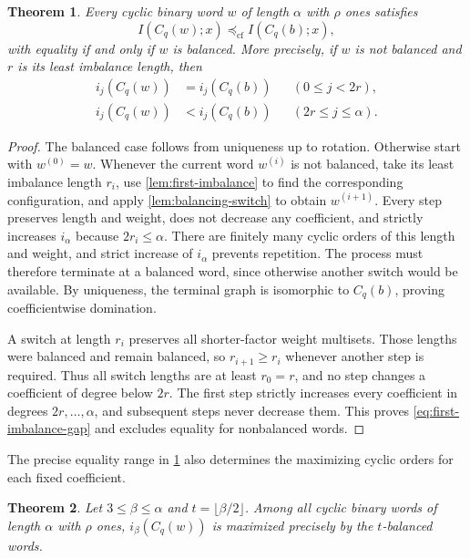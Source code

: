 \documentclass[11pt]{article}
\newtheorem{theorem}{Theorem}[section]
\theoremstyle{definition}
\newcommand{\preceqcf}{\preceq_{\mathrm{cf}}}
\begin{document}
\begin{theorem}
\label{thm:coefficientwise-order}
Every cyclic binary word $w$ of length $\alpha$ with $\rho$ ones
satisfies
\[
 I(C_q(w);x)\preceqcf I(C_q(b);x),
\]
with equality if and only if $w$ is balanced. More precisely, if $w$
is not balanced and $r$ is its least imbalance length, then
\begin{equation}\label{eq:first-imbalance-gap}
 \begin{aligned}
 i_j(C_q(w))&=i_j(C_q(b)) &&(0\le j<2r),\\
 i_j(C_q(w))&<i_j(C_q(b)) &&(2r\le j\le\alpha).
 \end{aligned}
\end{equation}
\end{theorem}

\begin{proof}
The balanced case follows from uniqueness up to rotation. Otherwise
start with $w^{(0)}=w$. Whenever the current word $w^{(i)}$ is not
balanced, take its least imbalance length $r_i$, use
\cref{lem:first-imbalance} to find the corresponding configuration,
and apply \cref{lem:balancing-switch} to obtain $w^{(i+1)}$.
Every step preserves length and weight, does not decrease any
coefficient, and strictly increases $i_\alpha$ because $2r_i\le\alpha$.
There are finitely many cyclic orders of this length and weight, and
strict increase of $i_\alpha$ prevents repetition. The process must
therefore terminate at a balanced word, since otherwise another
switch would be available. By uniqueness, the terminal graph is
isomorphic to $C_q(b)$, proving coefficientwise domination.

A switch at length $r_i$ preserves all shorter-factor weight
multisets. Those lengths were balanced and remain balanced, so
$r_{i+1}\ge r_i$ whenever another step is required. Thus all switch
lengths are at least $r_0=r$, and no step changes a coefficient of
degree below $2r$. The first step strictly increases every coefficient
in degrees $2r,\ldots,\alpha$, and subsequent steps never decrease
them. This proves \eqref{eq:first-imbalance-gap} and excludes equality
for nonbalanced words.
\end{proof}
The precise equality range in \cref{thm:coefficientwise-order}
also determines the maximizing cyclic orders for each fixed
coefficient.
\begin{theorem}\label{thm:fixed-order}
Let $3\le\beta\le\alpha$ and $t=\lfloor\beta/2\rfloor$.
Among all cyclic binary words of length $\alpha$ with $\rho$ ones,
$i_\beta(C_q(w))$ is maximized precisely by the $t$-balanced words.
\end{theorem}
\end{document}
